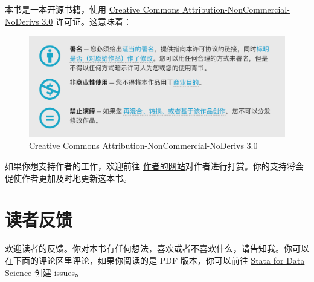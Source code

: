 本书是一本开源书籍，使用 \href{https://creativecommons.org/licenses/by-nc-nd/3.0/us/deed.zh}{Creative Commons Attribution-NonCommercial-NoDerivs 3.0} 许可证。这意味着：

\begin{figure}[htbp]
  \centering
  \includegraphics[width = \textwidth]{assets/license.png}
  \caption{Creative Commons Attribution-NonCommercial-NoDerivs 3.0}
  \label{fig:license}
\end{figure}

如果你想支持作者的工作，欢迎前往 \href{https://www.czxa.top}{作者的网站}对作者进行打赏。你的支持将会促使作者更加及时地更新这本书。

\section{读者反馈}

欢迎读者的反馈。你对本书有任何想法，喜欢或者不喜欢什么，请告知我。你可以在下面的评论区里评论，如果你阅读的是 PDF 版本，你可以前往 \href{https://wwww.czxa.top/stata4ds}{Stata for Data Science} 创建 \href{https://github.com/czxa/stata4ds/issues}{issues}。
